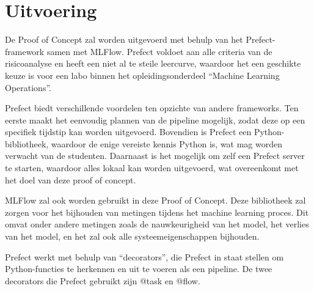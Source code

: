 \section{Uitvoering}


De Proof of Concept zal worden uitgevoerd met behulp van het Prefect-framework samen met MLFlow. Prefect voldoet aan alle criteria van de risicoanalyse en heeft een niet al te steile leercurve, waardoor het een geschikte keuze is voor een labo binnen het opleidingsonderdeel ``Machine Learning Operations''.

Prefect biedt verschillende voordelen ten opzichte van andere frameworks. Ten eerste maakt het eenvoudig plannen van de pipeline mogelijk, zodat deze op een specifiek tijdstip kan worden uitgevoerd. Bovendien is Prefect een Python-bibliotheek, waardoor de enige vereiste kennis Python is, wat mag worden verwacht van de studenten. Daarnaast is het mogelijk om zelf een Prefect server te starten, waardoor alles lokaal kan worden uitgevoerd, wat overeenkomt met het doel van deze proof of concept.

MLFlow zal ook worden gebruikt in deze Proof of Concept. Deze bibliotheek zal zorgen voor het bijhouden van metingen tijdens het machine learning proces. Dit omvat onder andere metingen zoals de nauwkeurigheid van het model, het verlies van het model, en het zal ook alle systeemeigenschappen bijhouden.

Prefect werkt met behulp van ``decorators'', die Prefect in staat stellen om Python-functies te herkennen en uit te voeren als een pipeline. De twee decorators die Prefect gebruikt zijn @task en @flow.


